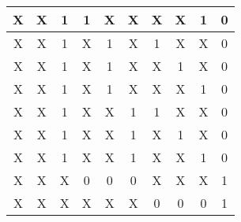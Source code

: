 \begin{center}
\begin{table}[h]
\begin{center}
\begin{tabular}{|c|c|c|c|c|c|c|c|c||c|}
            X  & X  & 1  & 1  & X  & X  & X  & X  & 1  & 0 \\ \hline
            X  & X  & 1  & X  & 1  & X  & 1  & X  & X  & 0 \\ \hline
            X  & X  & 1  & X  & 1  & X  & X  & 1  & X  & 0 \\ \hline
            X  & X  & 1  & X  & 1  & X  & X  & X  & 1  & 0 \\ \hline
            X  & X  & 1  & X  & X  & 1  & 1  & X  & X  & 0 \\ \hline
            X  & X  & 1  & X  & X  & 1  & X  & 1  & X  & 0 \\ \hline
            X  & X  & 1  & X  & X  & 1  & X  & X  & 1  & 0 \\ \hline
            X  & X  & X  & 0  & 0  & 0  & X  & X  & X  & 1 \\ \hline
            X  & X  & X  & X  & X  & X  & 0  & 0  & 0  & 1 \\ \hline
            \end{tabular}
        \end{center}
    \end{table}
\end{center}
